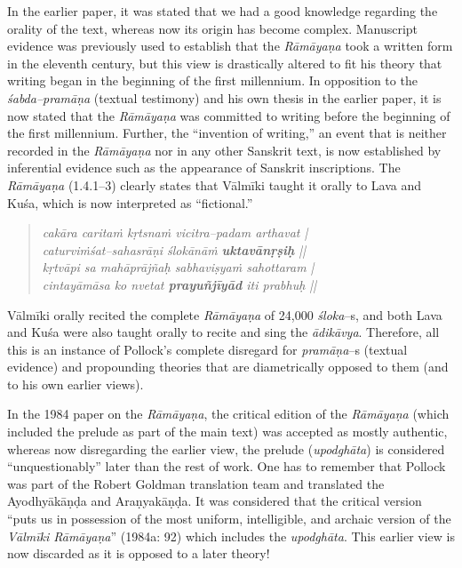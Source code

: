 In the earlier paper, it was stated that we had a good knowledge regarding the orality of the text, whereas now its origin has become complex. Manuscript evidence was previously used to establish that the \textit{Rāmāyaṇa} took a written form in the eleventh century, but this view is drastically altered to fit his theory that writing began in the beginning of the first millennium. In opposition to the \textit{śabda–pramāṇa} (textual testimony) and his own thesis in the earlier paper, it is now stated that the \textit{Rāmāyaṇa }was committed to writing before the beginning of the first millennium. Further, the “invention of writing,” an event that is neither recorded in the \textit{Rāmāyaṇa }nor in any other Sanskrit text, is now established by inferential evidence such as the appearance of Sanskrit inscriptions. The \textit{Rāmāyaṇa} (1.4.1–3) clearly states that Vālmīki taught it orally to Lava and Kuśa, which is now interpreted as “fictional.”

\begin{verse}
\textit{cakāra caritaṁ kṛtsnaṁ vicitra–padam arthavat |}\\\textit{caturviṁśat–sahasrāṇi ślokānāṁ \textbf{uktavānṛṣiḥ} ||}\\\textit{kṛtvāpi sa mahāprājñaḥ sabhaviṣyaṁ sahottaram |}\\\textit{cintayāmāsa ko nvetat \textbf{prayuñjīyād } iti prabhuḥ || }
\end{verse}

\newpage

Vālmīki orally recited the complete \textit{Rāmāyaṇa} of 24,000 \textit{śloka}–s, and both Lava and Kuśa were also taught orally to recite and sing the \textit{ādikāvya}. Therefore, all this is an instance of Pollock’s complete disregard for \textit{pramāṇa}–s (textual evidence) and propounding theories that are diametrically opposed to them (and to his own earlier views).

In the 1984 paper on the \textit{Rāmāyaṇa}, the critical edition of the \textit{Rāmāyaṇa} (which included the prelude as part of the main text) was accepted as mostly authentic, whereas now disregarding the earlier view, the prelude (\textit{upodghāta}) is considered “unquestionably” later than the rest of work. One has to remember that Pollock was part of the Robert Goldman translation team and translated the Ayodhyākāṇḍa and Araṇyakāṇḍa. It was considered that the critical version “puts us in possession of the most uniform, intelligible, and archaic version of the \textit{Vālmīki Rāmāyaṇa}” (1984a: 92) which includes the \textit{upodghāta}. This earlier view is now discarded as it is opposed to a later theory!

